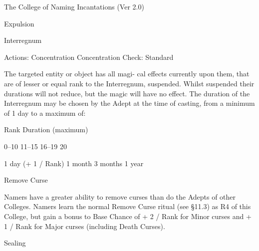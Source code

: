 \begin{Chapter}{The College of Naming Incantations (Ver 2.0)}
\begin{ritual}[R-2]{Expulsion }
\begin{effects}
\end{effects}
\end{ritual}

\begin{ritual}[R-3]{Interregnum }

Actions: Concentration 
Concentration Check: Standard 
\begin{effects}
The targeted entity or object has all magi-
cal effects currently upon them, that are of lesser or 
equal  rank  to  the  Interregnum,  suspended.  Whilst 
suspended  their  durations  will  not  reduce,  but  the 
magic  will  have  no  effect.  The  duration  of  the 
Interregnum  may  be  chosen  by  the  Adept  at  the 
time  of  casting,  from  a  minimum  of  1  day  to  a 
maximum of: 

Rank  Duration (maximum) 

0–10 
11–15 
16–19 
20 

1 day (+ 1 / Rank) 
1 month 
3 months 
1 year 

\end{effects}
\end{ritual}

\begin{ritual}[R-4]{Remove Curse }

\begin{effects}
Namers have a greater ability to remove curses than do the
Adepts of other Colleges. Namers learn the normal Remove Curse ritual
(see §11.3) as R4 of this College, but gain a bonus to Base Chance of
+ 2 / Rank for Minor curses and + 1 / Rank for Major curses (including
Death Curses).

\end{effects}
\end{ritual}

\begin{ritual}[R-5]{Sealing }


\end{ritual}
\end{Chapter}
